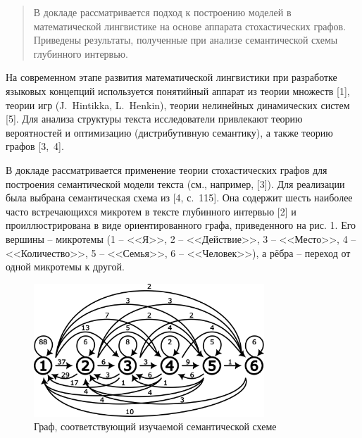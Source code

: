 \maketitle

\begin{abstract}
В докладе рассматривается подход к построению моделей в математической лингвистике на основе аппарата стохастических графов. Приведены результаты, полученные при анализе семантической схемы глубинного интервью.



\end{abstract}

 
На современном этапе развития математической лингвистики 
при разработке языковых концепций используется понятийный аппарат из теории множеств [1], теории игр (J.~Hintikka, L.~Henkin), теории нелинейных динамических систем [5]. Для анализа структуры текста исследователи привлекают теорию вероятностей и оптимизацию (дистрибутивную семантику), а также теорию графов [3,~4].

В докладе рассматривается применение теории стохастических графов для построения семантической модели текста (см., например, [3]). Для реализации была выбрана семантическая схема из [4, с.~115]. Она содержит шесть наиболее часто встречающихся микротем в тексте глубинного интервью [2] и проиллюстрирована в виде  ориентированного графа, приведенного на рис. 1. Его вершины -- микротемы (1 -- <<Я>>, 2 -- <<Действие>>, 3 -- <<Место>>, 4 -- <<Количество>>, 5 -- <<Семья>>, 6 -- <<Человек>>), а рёбра -- переход от одной микротемы к другой.
 


\begin{figure}
    \begin{center}
        \includegraphics[height=5cm]{skurygina_solodusha.png}
    \end{center}
    \caption{Граф, соответствующий изучаемой семантической схеме}
    \label{fig1}
\end{figure}




